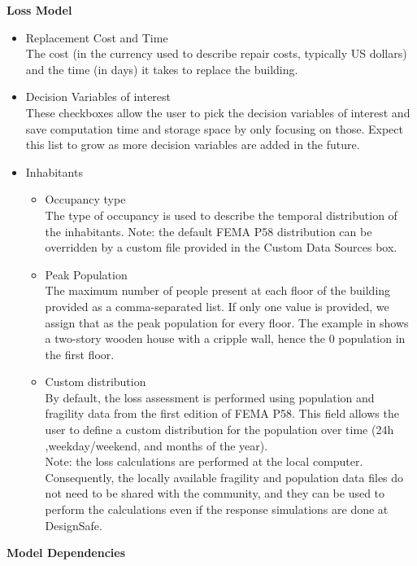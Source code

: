 \textbf{Loss Model}

\begin{itemize}
    \item Replacement Cost and Time\\
    The cost (in the currency used to describe repair costs, typically US dollars) and the time (in days) it takes to replace the building.
    \item Decision Variables of interest\\
    These checkboxes allow the user to pick the decision variables of interest and save computation time and storage space by only focusing on those. Expect this list to grow as more decision variables are added in the future.
    \item Inhabitants
    \begin{itemize}
        \item Occupancy type\\
        The type of occupancy is used to describe the temporal distribution of the inhabitants. Note: the default FEMA P58 distribution can be overridden by a custom file provided in the Custom Data Sources box.
        \item Peak Population\\
        The maximum number of people present at each floor of the building provided as a comma-separated list. If only one value is provided, we assign that as the peak population for every floor. The example in  shows a two-story wooden house with a cripple wall, hence the 0 population in the first floor.
        \item Custom distribution\\
        By default, the loss assessment is performed using population and fragility data from the first edition of FEMA P58. This field allows the user to define a custom distribution for the population over time (24h ,weekday/weekend, and months of the year).\\
        Note: the loss calculations are performed at the local computer. Consequently, the locally available fragility and population data files do not need to be shared with the community, and they can be used to perform the calculations even if the response simulations are done at DesignSafe.
    \end{itemize}
\end{itemize}

\vspace{12pt}
\textbf{Model Dependencies}
\vspace{6pt}

